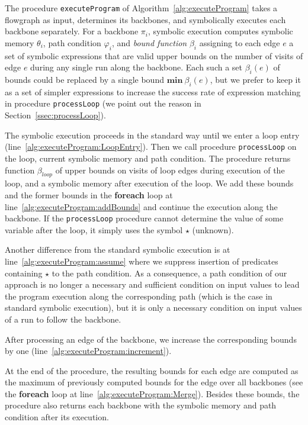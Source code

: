 \documentclass[10pt,a4paper]{article}
\newcommand{\minim}{\ensuremath{\mathbf{min}}}
\begin{document}
The procedure \texttt{executeProgram} of Algorithm~\ref{alg:executeProgram}
takes a flowgraph as input, determines its backbones, and symbolically
executes each backbone separately. For a backbone $\pi_i$, symbolic
execution computes symbolic memory $\theta_i$, path condition $\varphi_i$,
and \emph{bound function} $\beta_i$ assigning to each edge $e$ a set of
symbolic expressions that are valid upper bounds on the number of visits of
edge $e$ during any single run along the backbone. Each such a set
$\beta_i(e)$ of bounds could be replaced by a single bound
$\minim~\beta_i(e)$, but we prefer to keep it as a set of simpler
expressions to increase the success rate of expression matching in procedure
\texttt{processLoop} (we point out the reason in
Section~\ref{ssec:processLoop}).

The symbolic execution proceeds in the standard way until we enter a loop
entry (line~\ref{alg:executeProgram:LoopEntry}). Then we call procedure
\texttt{processLoop} on the loop, current symbolic memory and path
condition. The procedure returns function $\beta_\mathit{loop}$ of upper
bounds on visits of loop edges during execution of the loop, and a symbolic
memory after execution of the loop. We add these bounds and the former
bounds in the \textbf{foreach} loop at
line~\ref{alg:executeProgram:addBounds} and continue the execution along the
backbone.  If the \texttt{processLoop} procedure cannot determine the value
of some variable after the loop,
it simply uses the symbol $\star$ (unknown). 

Another difference from the standard symbolic execution is at
line~\ref{alg:executeProgram:assume} where we suppress insertion of
predicates containing $\star$ to the path condition. As a consequence, a
path condition of our approach is no longer a necessary and sufficient
condition on input values to lead the program execution along the
corresponding path (which is the case in standard symbolic execution), but
it is only a necessary condition on input values of a run to follow the
backbone.



After processing an edge of the backbone, we increase the corresponding
bounds by one (line~\ref{alg:executeProgram:increment}).

At the end of the procedure, the resulting bounds for each edge are computed
as the maximum of previously computed bounds for the edge over all backbones
(see the \textbf{foreach} loop at
line~\ref{alg:executeProgram:Merge}). Besides these bounds, the procedure
also returns each backbone with the symbolic memory and path condition after
its execution.
 
\end{document}
